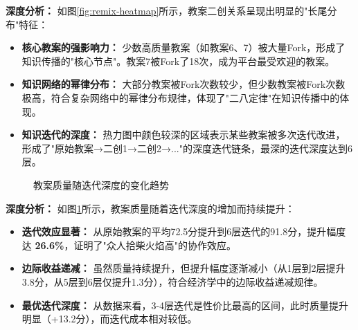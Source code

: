 \documentclass[12pt,a4paper,fontset=fandol]{ctexart}
\begin{document}
\textbf{深度分析：} 如图\ref{fig:remix-heatmap}所示，教案二创关系呈现出明显的"长尾分布"特征：
\begin{itemize}
    \item \textbf{核心教案的强影响力：} 少数高质量教案（如教案6、7）被大量Fork，形成了知识传播的"核心节点"。教案7被Fork了18次，成为平台最受欢迎的教案。
    \item \textbf{知识网络的幂律分布：} 大部分教案被Fork次数较少，但少数教案被Fork次数极高，符合复杂网络中的幂律分布规律，体现了"二八定律"在知识传播中的体现。
    \item \textbf{知识迭代的深度：} 热力图中颜色较深的区域表示某些教案被多次迭代改进，形成了"原始教案→二创1→二创2→..."的深度迭代链条，最深的迭代深度达到6层。
\end{itemize}

\begin{figure}[H]
    \centering
    \caption{教案质量随迭代深度的变化趋势}
    \label{fig:quality-iteration}
\end{figure}

\textbf{深度分析：} 如图\ref{fig:quality-iteration}所示，教案质量随着迭代深度的增加而持续提升：
\begin{itemize}
    \item \textbf{迭代效应显著：} 从原始教案的平均72.5分提升到6层迭代的91.8分，提升幅度达 \textbf{26.6\%}，证明了"众人拾柴火焰高"的协作效应。
    \item \textbf{边际收益递减：} 虽然质量持续提升，但提升幅度逐渐减小（从1层到2层提升3.8分，从5层到6层仅提升1.3分），符合经济学中的边际收益递减规律。
    \item \textbf{最优迭代深度：} 从数据来看，3-4层迭代是性价比最高的区间，此时质量提升明显（+13.2分），而迭代成本相对较低。
\end{itemize}
\end{document}
